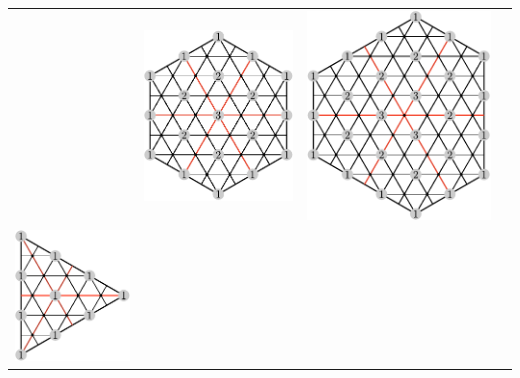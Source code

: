 \documentclass[11pt,oneside]{article}
\begin{document}
\begin{center}
\begin{tabular}{ c c c c }
& \includegraphics[scale=0.6]{images/sl3_weights_22.pdf}
& \includegraphics[scale=0.6]{images/sl3_weights_23.pdf} \\
  \includegraphics[scale=0.6]{images/sl3_weights_30.pdf}

\end{tabular}
\end{center}
\end{document}
